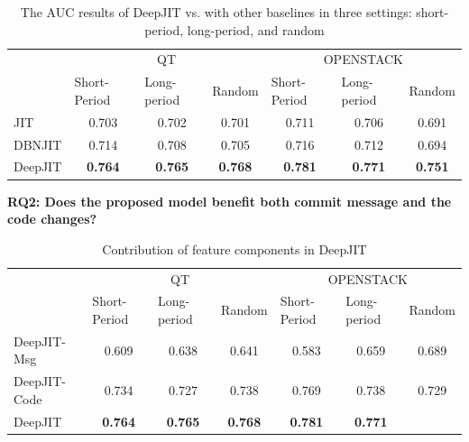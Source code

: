 \begin{table}[t!]
  \centering
  \caption{The AUC results of DeepJIT vs. with other baselines in three settings: short-period, long-period, and random}
    \begin{tabular}{|l|c|c|c|c|c|c|}
    \hline
    \multirow{2}[4]{*}{} & \multicolumn{3}{c|}{QT} & \multicolumn{3}{c|}{OPENSTACK} \\
\cline{2-7}          & \multicolumn{1}{l|}{Short-Period} & \multicolumn{1}{l|}{Long-period} & \multicolumn{1}{l|}{Random} & \multicolumn{1}{l|}{Short-Period} & \multicolumn{1}{l|}{Long-period} & \multicolumn{1}{l|}{Random} \\
    \hline
    \hline
    JIT   & 0.703 & 0.702 & 0.701 & 0.711 & 0.706 & 0.691 \\
    \hline
    DBNJIT & 0.714 & 0.708 & 0.705 & 0.716 & 0.712 & 0.694 \\
    \hline
    DeepJIT & \textbf{0.764} & \textbf{0.765} & \textbf{0.768} & \textbf{0.781} & \textbf{0.771} & \textbf{0.751} \\
    \hline
    \end{tabular}%
  \label{tab:results}%
\end{table}%

\noindent \textbf{RQ2: Does the proposed model benefit both commit message and the code changes?}

\begin{table}[t!]
  \centering
  \caption{Contribution of feature components in DeepJIT}
    \begin{tabular}{|l|c|c|c|c|c|c|}
    \hline
    \multirow{2}[4]{*}{} & \multicolumn{3}{c|}{QT} & \multicolumn{3}{c|}{OPENSTACK} \\
\cline{2-7}          & \multicolumn{1}{l|}{Short-Period} & \multicolumn{1}{l|}{Long-period} & \multicolumn{1}{l|}{Random} & \multicolumn{1}{l|}{Short-Period} & \multicolumn{1}{l|}{Long-period} & \multicolumn{1}{l|}{Random} \\
    \hline
    \hline
    DeepJIT-Msg & 0.609 & 0.638 & 0.641 & 0.583 & 0.659 & 0.689 \\
    \hline
    DeepJIT-Code & 0.734 & 0.727 & 0.738 & 0.769 & 0.738 & 0.729 \\
    \hline
    DeepJIT & \textbf{0.764} & \textbf{0.765} & \textbf{0.768} & \textbf{0.781} & \textbf{0.771} \\
    \hline
    \end{tabular}%
  \label{tab:variants}%
\end{table}%

